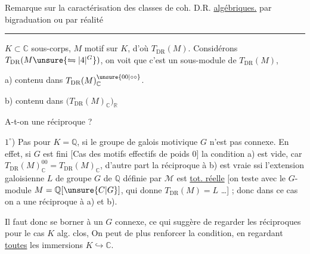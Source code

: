Remarque sur la caractérisation des classes de coh. D.R.  \uline{algébriques.} par bigraduation ou par réalité 
\par\noindent\rule{\linewidth}{0.3pt}\par
$K\subset\mathbb C$ sous-corps, $M$ motif sur $K$, d'où $T_{\mathrm{DR}}(M)$. Considérons $T_{\mathrm{DR}}(M\unsure{\leftrightharpoons|4|{}^{G}})$, on voit que c'est un sous-module de $T_{\mathrm{DR}}(M)$, 
\par a) contenu dans $T_{\mathrm{DR}}(M)_{\mathbb C}^{\unsure{00|\circ\circ}}$.
\par b)  contenu dans $\bigl(T_{\mathrm{DR}}(M)_{\mathbb C}\bigr)_{\mathbb R}$ 

A-t-on une réciproque ?

$1^\circ$) Pas pour  $K=\mathbb Q$, si le groupe de galois motivique $G$  n'est pas connexe. En effet, si $G$ est  fini [Cas des motifs effectifs de poids 0] la condition a) est vide, car $T_{\mathrm{DR}}(M)_{\mathbb C}^{00}=T_{\mathrm{DR}}(M)_{\mathbb C}$,  d'autre part  la réciproque à b) est vraie ssi l'extension galoisienne $L$ de groupe $G$ de $\mathbb Q$ définie par $\mathcal M$ est \uline{tot. réelle} [on teste avec le $G$-module $M=\mathbb Q[\unsure{C|G}]$, qui donne $T_{\mathrm{DR}}(M)=L$ \ldots] ; donc dans ce cas on a une réciproque à a) et b).

Il faut donc se borner à un $G$ connexe, ce qui suggère de regarder les réciproques pour le cas $K$ alg. clos,  On peut de plus renforcer la condition, en regardant \uline{toutes} les immersions $K\hookrightarrow\mathbb C$.

